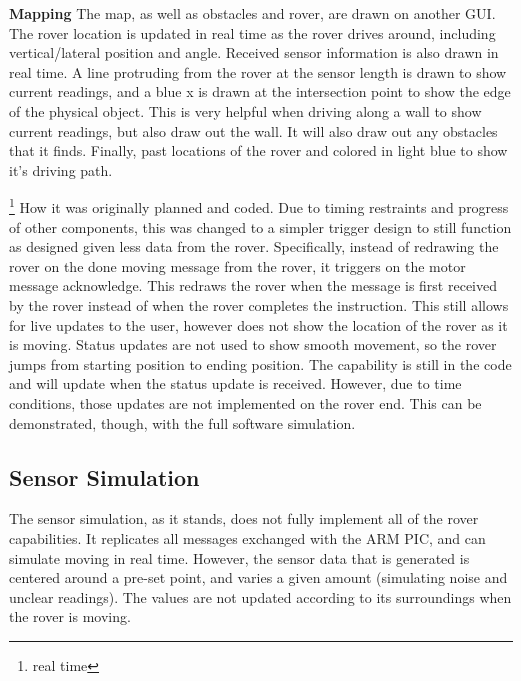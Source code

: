 {\textbf{Mapping}
The map, as well as obstacles and rover, are drawn on another GUI. The rover location is updated in real time\cite{real time} as the rover drives around, including vertical/lateral position and angle. Received sensor information is also drawn in real time. A line protruding from the rover at the sensor length is drawn to show current readings, and a blue x is drawn at the intersection point to show the edge of the physical object. This is very helpful when driving along a wall to show current readings, but also draw out the wall. It will also draw out any obstacles that it finds. Finally, past locations of the rover and colored in light blue to show it’s driving path.

\footnote{real time}
How it was originally planned and coded. Due to timing restraints and progress of other components, this was changed to a simpler trigger design to still function as designed given less data from the rover. Specifically, instead of redrawing the rover on the done moving message from the rover, it triggers on the motor message acknowledge. This redraws the rover when the message is first received by the rover instead of when the rover completes the instruction. This still allows for live updates to the user, however does not show the location of the rover as it is moving. Status updates are not used to show smooth movement, so the rover jumps from starting position to ending position. The capability is still in the code and will update when the status update is received. However, due to time conditions, those updates are not implemented on the rover end. This can be demonstrated, though, with the full software simulation.

\subsection{Sensor Simulation}
The sensor simulation, as it stands, does not fully implement all of the rover capabilities. It replicates all messages exchanged with the ARM PIC, and can simulate moving in real time. However, the sensor data that is generated is centered around a pre-set point, and varies a given amount (simulating noise and unclear readings). The values are not updated according to its surroundings when the rover is moving.



}
